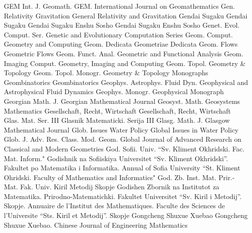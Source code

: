 {GEM Int. J. Geomath.}
{GEM. International Journal on Geomathematics}
{Gen. Relativity Gravitation}
{General Relativity and Gravitation}
{Gendai Sugaku}
{Gendai Sugaku}
{Gendai Sugaku Enshu Sosho}
{Gendai Sugaku Enshu Sosho}
{Genet. Evol. Comput. Ser.}
{Genetic and Evolutionary Computation Series}
{Geom. Comput.}
{Geometry and Computing}
{Geom. Dedicata}
{Geometriae Dedicata}
{Geom. Flows}
{Geometric Flows}
{Geom. Funct. Anal.}
{Geometric and Functional Analysis}
{Geom. Imaging Comput.}
{Geometry, Imaging and Computing}
{Geom. Topol.}
{Geometry & Topology}
{Geom. Topol. Monogr.}
{Geometry & Topology Monographs}
{Geombinatorics}
{Geombinatorics}
{Geophys. Astrophys. Fluid Dyn.}
{Geophysical and Astrophysical Fluid Dynamics}
{Geophys. Monogr.}
{Geophysical Monograph}
{Georgian Math. J.}
{Georgian Mathematical Journal}
{Geosyst. Math.}
{Geosystems Mathematics}
{Gesellschaft, Recht, Wirtschaft}
{Gesellschaft, Recht, Wirtschaft}
{Glas. Mat. Ser. III}
{Glasnik Matematicki. Serija III}
{Glasg. Math. J.}
{Glasgow Mathematical Journal}
{Glob. Issues Water Policy}
{Global Issues in Water Policy}
{Glob. J. Adv. Res. Class. Mod. Geom.}
{Global Journal of Advanced Research on Classical and Modern Geometries}
{God. Sofii. Univ. ``Sv. Kliment Okhridski. Fac. Mat. Inform."}
{Godishnik na Sofiiskiya Universitet ``Sv. Kliment Okhridski''. Fakultet po Matematika i Informatika. Annual of Sofia University ``St. Kliment Ohridski. Faculty of Mathematics and Informatics"}
{God. Zb. Inst. Mat. Prir.-Mat. Fak. Univ. Kiril Metodij Skopje}
{Godishen Zbornik na Institutot za Matematika. Prirodno-Matematichki. Fakultet Universitet ``Sv. Kiril i Metodij''. Skopje. Annuaire de l'Institut des Mathematiques. Faculte des Sciences de l'Universite ``Sts. Kiril et Metodij''. Skopje}
{Gongcheng Shuxue Xuebao}
{Gongcheng Shuxue Xuebao. Chinese Journal of Engineering Mathematics}
